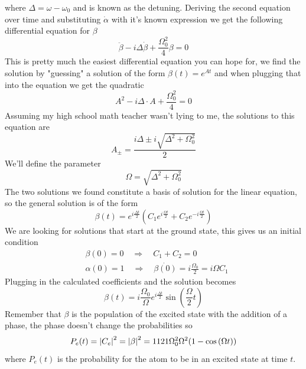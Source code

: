 \documentclass[english, a4paper, 12pt, twoside]{article}
\numberwithin{equation}{section} %
\begin{document}
where $\Delta = \omega - \omega_0$ and is known as the detuning. Deriving the second equation over time and substituting $\dot{\alpha}$ with it's known expression we get the following differential equation for $\beta$
\[
    \ddot{\beta} - i \Delta \dot{\beta} + \frac{\Omega_0^2}{4}\beta = 0
\]
This is pretty much the easiest differential equation you can hope for, we find the solution by "guessing" a solution of the form $\beta(t) = e^{A t}$ and when plugging that into the equation we get the quadratic
\[
    A^2 - i \Delta \cdot A + \frac{\Omega_0^2}{4} = 0
\]
Assuming my high school math teacher wasn't lying to me, the solutions to this equation are
\[
    A_{\pm} = \frac{i \Delta \pm i\sqrt{\Delta^2 + \Omega_0^2}}{2}
\]
We'll define the parameter
\[
    \Omega = \sqrt{\Delta^2 + \Omega_0^2}
\]
The two solutions we found constitute a basis of solution for the linear equation, so the general solution is of the form
\[
    \beta(t) = e^{i\frac{\Delta t}{2}}(C_1 e^{i \frac{\Omega t}{2}} + C_2 e^{-i \frac{\Omega t}{2}})
\]
We are looking for solutions that start at the ground state, this gives us an initial condition
\begin{align*}
    &\beta(0) = 0 \quad \Rightarrow \quad C_1 + C_2 = 0 \\
    &\alpha(0) = 1 \quad \Rightarrow \quad \dot{\beta(0)} = i \frac{\Omega_0}{2} = i \Omega C_1
\end{align*}
Plugging in the calculated coefficients and the solution becomes
\[
    \beta(t) = i \frac{\Omega_0}{\Omega}e^{i \frac{\Delta t}{2}} \sin{(\frac{\Omega}{2}t)}
\]
Remember that $\beta$ is the population of the excited state with the addition of a phase, the phase doesn't change the probabilities so
\[
    P_e(t) = \abs{C_e}^2 = \abs{\beta}^2 = 1{1}{2}1{\Omega_0^2}{\Omega^2}(1 - \cos{(\Omega t)})
\]
where $P_e(t)$ is the probability for the atom to be in an excited state at time $t$.
\end{document}
